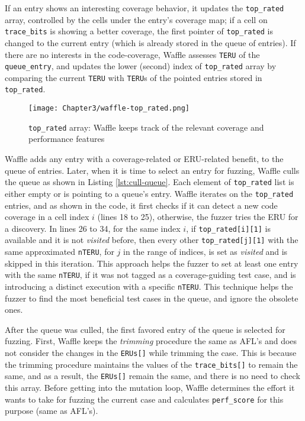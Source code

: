 If an entry shows an interesting coverage behavior, it updates the \texttt{top\_rated} array, controlled by the cells under the entry's coverage map; if a cell on \texttt{trace\_bits} is showing a better coverage, the first pointer of \texttt{top\_rated} is changed to the current entry (which is already stored in the queue of entries). If there are no interests in the code-coverage, Waffle assesses \texttt{TERU} of the \texttt{queue\_entry}, and updates the lower (second) index of \texttt{top\_rated} array by comparing the current \texttt{TERU} with \texttt{TERU}s of the pointed entries stored in \texttt{top\_rated}.

\begin{figure}[!b]
  \texttt{[image: Chapter3/waffle-top\_rated.png]}
  \centering
  \caption{\texttt{top\_rated} array: Waffle keeps track of the relevant coverage and performance features}
  \label{fig:waffle-top_rated}
\end{figure}


Waffle adds any entry with a coverage-related or ERU-related benefit, to the queue of entries. Later, when it is time to select an entry for fuzzing, Waffle culls the queue as shown in Listing \ref{lst:cull-queue}. Each element of \texttt{top\_rated} list is either empty or is pointing to a queue's entry. Waffle iterates on the \texttt{top\_rated} entries, and as shown in the code, it first checks if it can detect a new code coverage in a cell index $i$ (lines 18 to 25), otherwise, the fuzzer tries the ERU for a discovery. In lines 26 to 34, for the same index $i$, if \texttt{top\_rated[i][1]} is available and it is not \textit{visited} before, then every other \texttt{top\_rated[j][1]} with the same approximated \texttt{nTERU}, for $j$ in the range of indices, is set as \textit{visited} and is skipped in this iteration. This approach helps the fuzzer to set at least one entry with the same \texttt{nTERU}, if it was not tagged as a coverage-guiding test case, and is introducing a distinct execution with a specific \texttt{nTERU}. This technique helps the fuzzer to find the most beneficial test cases in the queue, and ignore the obsolete ones.




After the queue was culled, the first favored entry of the queue is selected for fuzzing. First, Waffle keeps the \textit{trimming} procedure the same as AFL's and does not consider the changes in the \texttt{ERUs[]} while trimming the case. This is because the trimming procedure maintains the values of the \texttt{trace\_bits[]} to remain the same, and as a result, the \texttt{ERUs[]} remain the same, and there is no need to check this array. Before getting into the mutation loop, Waffle determines the effort it wants to take for fuzzing the current case and calculates \texttt{perf\_score} for this purpose (same as AFL's).

